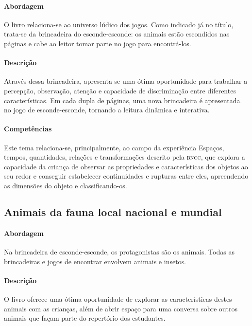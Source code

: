 \documentclass[11pt]{extarticle}
\begin{document}
\paragraph{Abordagem} O livro relaciona-se ao universo lúdico dos jogos. Como indicado já no título, trata-se da brincadeira do esconde-esconde: os animais estão escondidos nas páginas e cabe ao leitor tomar parte no jogo para encontrá-los.

\paragraph{Descrição} Através dessa brincadeira, apresenta-se uma ótima oportunidade para trabalhar a percepção, observação, atenção e capacidade de discriminação entre diferentes características. Em cada dupla de páginas, uma nova brincadeira é apresentada no jogo de esconde-esconde, tornando a leitura dinâmica e interativa.

\paragraph{Competências} Este tema relaciona-se, principalmente, ao 
campo da experiência Espaços, tempos, quantidades, relações e transformações 
descrito pela \textsc{bncc}, que explora a capacidade da criança de observar as propriedades e características dos objetos ao seu redor e conseguir estabelecer continuidades e rupturas entre eles, apreendendo as dimensões do objeto e classificando-os.

\subsection{Animais da fauna local nacional e mundial}

\paragraph{Abordagem} Na brincadeira de esconde-esconde, os protagonistas são os animais. 
Todas as brincadeiras e jogos de encontrar envolvem animais e insetos.

\paragraph{Descrição} O livro oferece uma ótima oportunidade de explorar 
as características destes animais com as crianças, além de abrir espaço para uma 
conversa sobre outros animais que façam parte do repertório dos estudantes. 
\end{document}
